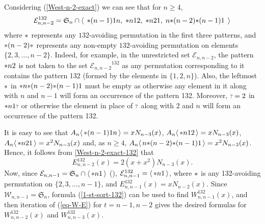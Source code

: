 \documentclass[11pt]{article}
\newcommand{\sortable}[2]{\ensuremath{\mathcal{W}_{#1,#2}}}
\newcommand{\exactly}[2]{\ensuremath{\mathcal{E}_{#1,#2}}}
\newcommand{\sym}{\mathfrak{S}}
\newcommand{\st}{\mbox{\ensuremath{\ast}}}
\newcommand{\q}{\mbox{\ensuremath{\scriptstyle{?}}}}
\newcommand{\+}{\mbox{\ensuremath{\scriptstyle{+}}}}
\newcommand{\glob}[1]{\ensuremath{\langle\, #1\,\rangle}}
\begin{document}
Considering (\ref{West-n-2-exact}) we can see that for $n\geq 4$,
\begin{align}\label{West-n-2-exact-132}
	\exactly{n}{n-2}^{132} = \sym_n \cap
	\glob{\; \st(n-1)1n,\; \st n12,\; \st n21,\; n\st(n-2)\st (n-1)1\;}
\end{align}
where $\st$ represents any $132$-avoiding permutation in the first three patterns, and {$\st(n-2)\st$ represents any non-empty $132$-avoiding permutation} on elements $\{2,3,\ldots,n-2\}$. Indeed, for example, in the unrestricted set $\exactly{n}{n-2}$, the pattern $\st n2$ is not taken to the set  $\exactly{n}{n-2}^{132}$ as any permutation corresponding to it contains the pattern 132 (formed by the elements in $\{1,2,n\}$). Also, the leftmost $\st$ in $\st n\st(n-2)\st (n-1)1$ must be empty as otherwise any element in it along with $n$ and $n-1$ will form an occurrence of the pattern 132. Moreover, $\q=2$ in $\st n1\q$ or otherwise the element in place of $\q$ along with $2$ and $n$ will form an occurrence of the pattern 132.

It is easy to see that $A_n \glob{\st(n-1)1n}=xN_{n-3}(x)$, $A_n \glob{\st n12}=xN_{n-3}(x)$, $A_n \glob{\st n21}=x^2N_{n-3}(x)$ and, as $n\geq 4$, $A_n \glob{n\st(n-2)\st (n-1)1}=x^2N_{n-3}(x)$. Hence, it follows from \eqref{West-n-2-exact-132} that
$$E^{132}_{n,n-2}(x)=2(x+x^2)N_{n-3}(x).$$
Now, since $\exactly{n}{n-1}=\sym_n \cap \glob{\st n1}$ (\cite{West1990Permutations}),  $\exactly{n}{n-1}^{132}=\glob{\st n1}$, where $\st$ is any 132-avoiding permutation on $\{2,3,\ldots,n-1\}$, and $E^{132}_{n,n-1}(x)=xN_{n-2}(x)$. Since $\sortable{n}{n-1}=\sym_n$, formula (\ref{1-st-sort-132}) can be used to find $W^{132}_{n,n-1}(x)$, and then iteration of (\ref{eq-W-E}) for $t=n-1, n-2$ gives the desired formulas for $W^{132}_{n,n-2}(x)$ and $W^{132}_{n,n-3}(x)$.
\end{document}
